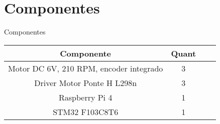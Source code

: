 
\section{Componentes}



\begin{quadro}[htb]
\caption{\label{lista de componentes}Componentes}
 \begin{tabular}{|c|c|c|c|}
	\hline
	\textbf{Componente} & \textbf{Quant} \\ \hline
	Motor DC 6V,  210 RPM, encoder integrado & 3  \\ \hline
	Driver Motor Ponte H L298n  & 3  \\ \hline
	Raspberry Pi 4    & 1   \\ \hline
	STM32 F103C8T6 & 1     \\ \hline
\end{tabular}
\end{quadro}



